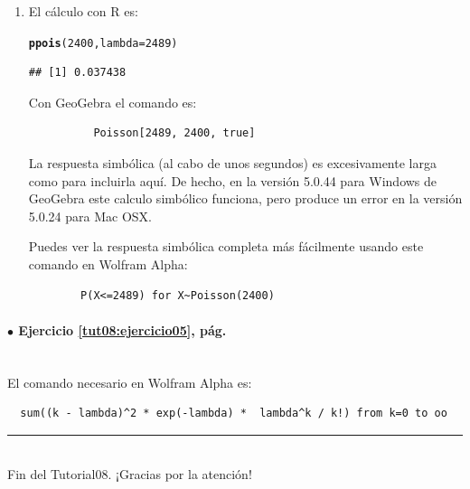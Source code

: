 \documentclass[10pt,a4paper]{article}\usepackage[]{graphicx}\usepackage[]{color}
\makeatletter
\newcommand{\hlnum}[1]{\textcolor[rgb]{0.686,0.059,0.569}{#1}}%
\newcommand{\hlstd}[1]{\textcolor[rgb]{0.345,0.345,0.345}{#1}}%
\newcommand{\hlkwc}[1]{\textcolor[rgb]{0.333,0.667,0.333}{#1}}%
\newcommand{\hlkwd}[1]{\textcolor[rgb]{0.737,0.353,0.396}{\textbf{#1}}}%
\newenvironment{kframe}{%
 \def\at@end@of@kframe{}%
 \ifinner\ifhmode%
  \def\at@end@of@kframe{\end{minipage}}%
  \begin{minipage}{\columnwidth}%
 \fi\fi%
 \def\FrameCommand##1{\hskip\@totalleftmargin \hskip-\fboxsep
 \colorbox{shadecolor}{##1}\hskip-\fboxsep
     \hskip-\linewidth \hskip-\@totalleftmargin \hskip\columnwidth}%
 \MakeFramed {\advance\hsize-\width
   \@totalleftmargin\z@ \linewidth\hsize
   \@setminipage}}%
 {\par\unskip\endMakeFramed%
 \at@end@of@kframe}
\newenvironment{knitrout}{}{} %
\newcounter {cont01}
\makeatother
\begin{document}
\begin{enumerate}
  \item El cálculo con R es:
\begin{knitrout}
\color{fgcolor}\begin{kframe}
\begin{alltt}
\hlkwd{ppois}\hlstd{(}\hlnum{2400}\hlstd{,} \hlkwc{lambda}\hlstd{=}\hlnum{2489}\hlstd{)}
\end{alltt}
\begin{verbatim}
## [1] 0.037438
\end{verbatim}
\end{kframe}
\end{knitrout}
        Con GeoGebra el comando es:
        \begin{verbatim}
          Poisson[2489, 2400, true]
        \end{verbatim}
        La respuesta simbólica (al cabo de unos segundos) es excesivamente larga como para incluirla aquí. De hecho, en la versión 5.0.44  para Windows de GeoGebra este calculo simbólico  funciona, pero produce un error en la versión 5.0.24 para Mac OSX.

        Puedes ver la respuesta simbólica completa más fácilmente usando este comando en Wolfram Alpha:
        \begin{verbatim}
        P(X<=2489) for X~Poisson(2400)
        \end{verbatim}



\end{enumerate}



\paragraph{\bf $\bullet$ Ejercicio \ref{tut08:ejercicio05}, pág. \pageref{tut08:ejercicio05}}
\label{tut08:ejercicio05:sol}\quad\\

El comando necesario en Wolfram Alpha es:
\begin{verbatim}
  sum((k - lambda)^2 * exp(-lambda) *  lambda^k / k!) from k=0 to oo
\end{verbatim}


\vspace{2cm} \hrule
\quad\\
Fin del Tutorial08. ¡Gracias por la atención!


%
\end{document}
